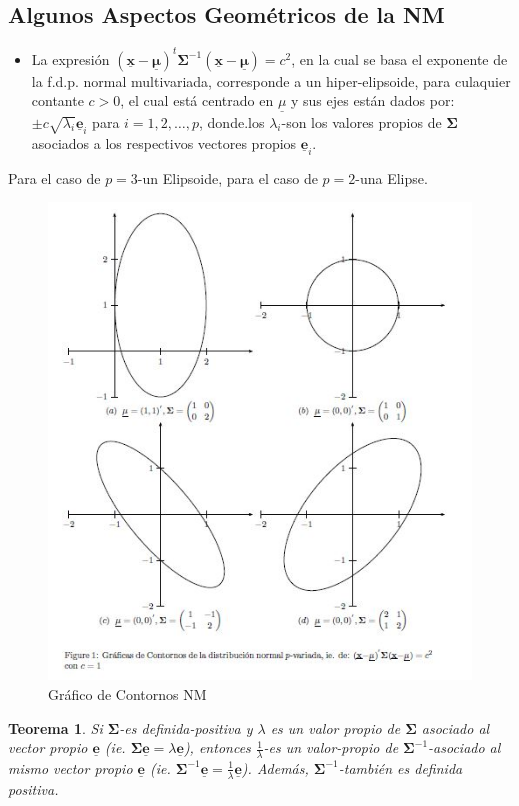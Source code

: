 \documentclass[
]{book}
\providecommand{\tightlist}{%
  \setlength{\itemsep}{0pt}\setlength{\parskip}{0pt}}
\newtheorem{theorem}{Teorema}[chapter]
\theoremstyle{definition}
\theoremstyle{definition}
\theoremstyle{definition}
\theoremstyle{definition}
\theoremstyle{remark}
\begin{document}
\hypertarget{algunos-aspectos-geomuxe9tricos-de-la-nm}{%
\subsection{Algunos Aspectos Geométricos de la NM}\label{algunos-aspectos-geomuxe9tricos-de-la-nm}}

\begin{itemize}
\tightlist
\item
  La expresión \((\underline{\mathbf{x}}-\underline{\mathbf{\mu}})^t\mathbf{\Sigma}^{-1}(\underline{\mathbf{x}}-\underline{\mathbf{\mu}})=c^2\), en la cual se basa el exponente de la f.d.p. normal multivariada, corresponde a un hiper-elipsoide, para culaquier contante \(c>0\), el cual está centrado en \(\underline{\mu}\) y sus ejes están dados por: \(\pm c\sqrt{\lambda_i}\underline{\mathbf{e}}_i\) para \(i=1,2,\ldots,p\), donde.los \(\lambda_i\)-son los valores propios de \(\mathbf{\Sigma}\) asociados a los respectivos vectores propios \(\underline{\mathbf{e}}_i\).
\end{itemize}

Para el caso de \(p=3\)-un Elipsoide, para el caso de \(p=2\)-una Elipse.

\begin{figure}

{\centering \includegraphics[width=0.5\linewidth]{imagenes/graf59} 

}

\caption{Gráfico de Contornos NM}\label{fig:contornos-prob}
\end{figure}

\begin{theorem}
\protect\hypertarget{thm:teorema-val-vect-prop}{}\label{thm:teorema-val-vect-prop}Si \(\mathbf{\Sigma}\)-es definida-positiva y \(\lambda\) es un valor propio de \(\mathbf{\Sigma}\) asociado al vector propio \(\underline{\mathbf{e}}\) (ie. \(\mathbf{\Sigma} \underline{\mathbf{e}}=\lambda \underline{\mathbf{e}}\)), entonces \(\frac{1}{\lambda}\)-es un valor-propio de \(\mathbf{\Sigma}^{-1}\)-asociado al mismo vector propio \(\underline{\mathbf{e}}\) (ie. \(\mathbf{\Sigma}^{-1} \underline{\mathbf{e}}=\frac{1}{\lambda} \underline{\mathbf{e}}\)). Además, \(\mathbf{\Sigma}^{-1}\)-también es definida positiva.
\end{theorem}
\end{document}

